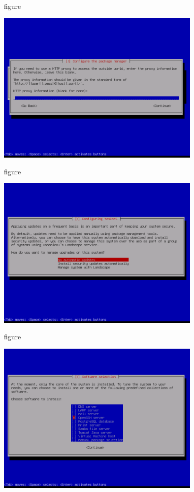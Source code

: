 \begin{nofloat}{figure}
\begin{center}
\includegraphics[width=0.75\textwidth]{screenshots/32_ubuntu_install.png}
\end{center}
\end{nofloat}

\begin{nofloat}{figure}
\begin{center}
\includegraphics[width=0.75\textwidth]{screenshots/33_ubuntu_install.png}
\end{center}
\end{nofloat}

\begin{nofloat}{figure}
\begin{center}
\includegraphics[width=0.75\textwidth]{screenshots/34_ubuntu_install.png}
\end{center}
\end{nofloat}

